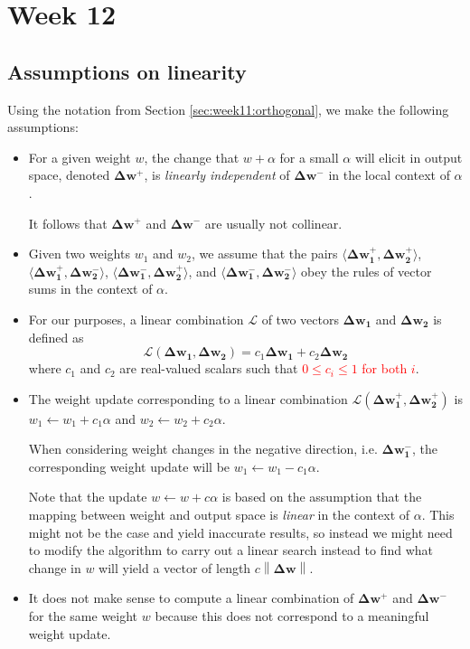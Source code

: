 \documentclass{article}
\renewcommand\vec{\mathbf}
\newcommand{\norm}[1]{\left\lVert#1\right\rVert}
\begin{document}
\section{Week 12}

\subsection{Assumptions on linearity}
Using the notation from Section \ref{sec:week11:orthogonal}, we make the following assumptions: 
\begin{itemize}
    \item For a given weight $w$, the change that $w+\alpha$ for a small $\alpha$ will elicit in output space, denoted $\vec{\Delta w^+}$, is \textit{linearly independent} of $\vec{\Delta w^-}$ in the local context of $\alpha$. 
    
    It follows that $\vec{\Delta w^+}$ and $\vec{\Delta w^-}$ are usually not collinear. 
    \item Given two weights $w_1$ and $w_2$, we assume that the pairs $\langle \vec{\Delta w_1^+, \Delta w_2^+} \rangle$, $\langle \vec{\Delta w_1^+, \Delta w_2^-} \rangle$, $\langle \vec{\Delta w_1^-, \Delta w_2^+} \rangle$, and $\langle \vec{\Delta w_1^-, \Delta w_2^-} \rangle$ obey the rules of vector sums in the context of $\alpha$.

    \item For our purposes, a linear combination $\vec{\mathcal{L}}$ of two vectors $\vec{\Delta w_1}$ and $\vec{\Delta w_2}$ is defined as
        $$\vec{\mathcal{L}}(\vec{\Delta w_1}, \vec{\Delta w_2}) = c_1 \vec{\Delta w_1} + c_2 \vec{\Delta w_2}$$
        where $c_1$ and $c_2$ are real-valued scalars such that \textcolor{red}{$0 \leq c_i \leq 1$ for both $i$}.
    \item The weight update corresponding to a linear combination $\vec{\mathcal{L}}(\vec{\Delta w_1^+}, \vec{\Delta w_2^+})$ is $w_1 \leftarrow w_1 + c_1 \alpha$ and $w_2 \leftarrow w_2 + c_2 \alpha$. 
        
    When considering weight changes in the negative direction, i.e. $\vec{\Delta w_1^-}$, the corresponding weight update will be $w_1 \leftarrow w_1 - c_1 \alpha$.
    
    Note that the update $w \leftarrow w + c \alpha$ is based on the assumption that the mapping between weight and output space is \textit{linear} in the context of $\alpha$. 
    This might not be the case and yield inaccurate results, so instead we might need to modify the algorithm to carry out a linear search instead to find what change in $w$ will yield a vector of length $c \norm{\vec{\Delta w}}$.
    \item It does not make sense to compute a linear combination of $\vec{\Delta w^+}$ and $\vec{\Delta w^-}$ for the same weight $w$ because this does not correspond to a meaningful weight update. 
\end{itemize}
\end{document}
